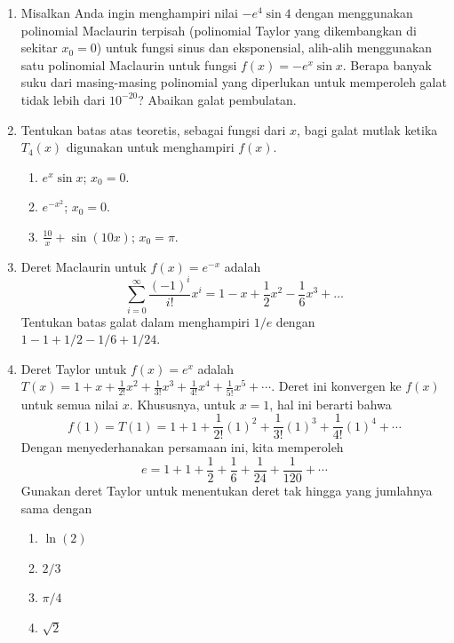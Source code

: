 \begin{enumerate}
\begin{enumerate}
\item $f(0)$.
\item $f(10)$.
\end{enumerate}
\item Misalkan Anda ingin menghampiri nilai $-e^{4}\sin4$ dengan menggunakan
polinomial Maclaurin terpisah (polinomial Taylor yang dikembangkan
di sekitar $x_{0}=0$) untuk fungsi sinus dan eksponensial, alih-alih
menggunakan satu polinomial Maclaurin untuk fungsi $f(x)=-e^{x}\sin x$.
Berapa banyak suku dari masing-masing polinomial yang diperlukan untuk
memperoleh galat tidak lebih dari $10^{-20}$? Abaikan galat pembulatan.
\item Tentukan batas atas teoretis, sebagai fungsi dari $x$, bagi galat
mutlak ketika $T_{4}(x)$ digunakan untuk menghampiri $f(x)$.

\begin{enumerate}
\item $e^{x}\sin x$; $x_{0}=0$.
\item \label{exc:taylor5}$e^{-x^{2}}$; $x_{0}=0$. \hasasolution 
\item $\frac{10}{x}+\sin(10x)$; $x_{0}=\pi$.
\end{enumerate}
\item Deret Maclaurin untuk $f(x)=e^{-x}$ adalah
\[
\sum_{i=0}^{\infty}\frac{(-1)^{i}}{i!}x^{i}=1-x+\frac{1}{2}x^{2}-\frac{1}{6}x^{3}+\ldots
\]
 Tentukan batas galat dalam menghampiri $1/e$ dengan $1-1+1/2-1/6+1/24$.
\item Deret Taylor untuk $f(x)=e^{x}$ adalah ${\displaystyle T(x)=1+x+\frac{1}{2!}x^{2}+\frac{1}{3!}x^{3}+\frac{1}{4!}x^{4}+\frac{1}{5!}x^{5}+\cdots}$.
Deret ini konvergen ke $f(x)$ untuk semua nilai $x$. Khususnya,
untuk $x=1$, hal ini berarti bahwa
\[
f(1)=T(1)=1+1+\frac{1}{2!}(1)^{2}+\frac{1}{3!}(1)^{3}+\frac{1}{4!}(1)^{4}+\cdots
\]
Dengan menyederhanakan persamaan ini, kita memperoleh
\[
e=1+1+\frac{1}{2}+\frac{1}{6}+\frac{1}{24}+\frac{1}{120}+\cdots
\]
Gunakan deret Taylor untuk menentukan deret tak hingga yang jumlahnya
sama dengan 

\begin{enumerate}
\item $\ln(2)$
\item $2/3$
\item $\pi/4$
\item $\sqrt{2}$
\end{enumerate}
\end{enumerate}
\finishexercises
